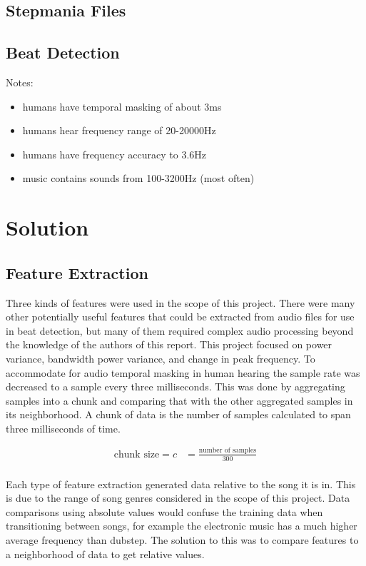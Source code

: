 \documentclass[12pt]{article}
\begin{document}
\subsection{Stepmania Files}

\subsection{Beat Detection}
Notes:
	\begin{itemize}
		\item humans have temporal masking of about 3ms
		\item humans hear frequency range of 20-20000Hz
		\item humans have frequency accuracy to 3.6Hz
		\item music contains sounds from 100-3200Hz (most often)
	\end{itemize}


\section{Solution}

\subsection{Feature Extraction}
Three kinds of features were used in the scope of this project. There were many other potentially useful features that could be extracted from audio files for use in beat detection, but many of them required complex audio processing beyond the knowledge of the authors of this report. This project focused on power variance, bandwidth power variance, and change in peak frequency. To accommodate for audio temporal masking in human hearing the sample rate was decreased to a sample every three milliseconds. This was done by aggregating samples into a chunk and comparing that with the other aggregated samples in its neighborhood. A chunk of data is the number of samples calculated to span three milliseconds of time.

\begin{align*}
	\text{chunk size} = c &= \frac{\text{number of samples}}{300}\\
\end{align*}

Each type of feature extraction generated data relative to the song it is in. This is due to the range of song genres considered in the scope of this project. Data comparisons using absolute values would confuse the training data when transitioning between songs, for example the electronic music has a much higher average frequency than dubstep. The solution to this was to compare features to a neighborhood of data to get relative values.
\end{document}
